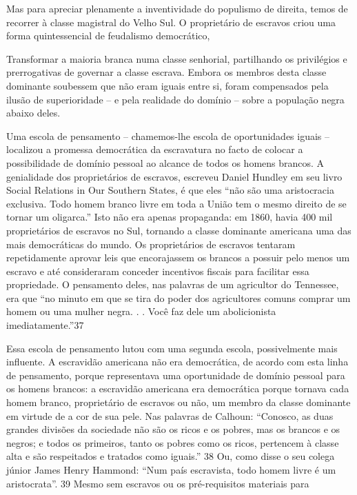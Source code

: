  \par 
Mas para apreciar plenamente a inventividade do populismo de direita, temos de recorrer à classe magistral do Velho Sul. O proprietário de escravos criou uma forma quintessencial de feudalismo democrático,
 \par 
Transformar a maioria branca numa classe senhorial, partilhando os privilégios e prerrogativas de governar a classe escrava. Embora os membros desta classe dominante soubessem que não eram iguais entre si, foram compensados ​​pela ilusão de superioridade – e pela realidade do domínio – sobre a população negra abaixo deles.
 \par 
Uma escola de pensamento – chamemos-lhe escola de oportunidades iguais – localizou a promessa democrática da escravatura no facto de colocar a possibilidade de domínio pessoal ao alcance de todos os homens brancos. A genialidade dos proprietários de escravos, escreveu Daniel Hundley em seu livro Social Relations in Our Southern States, é que eles “não são uma aristocracia exclusiva. Todo homem branco livre em toda a União tem o mesmo direito de se tornar um oligarca.” Isto não era apenas propaganda: em 1860, havia {\color{blue}400} mil proprietários de escravos no Sul, tornando a classe dominante americana uma das mais democráticas do mundo. Os proprietários de escravos tentaram repetidamente aprovar leis que encorajassem os brancos a possuir pelo menos um escravo e até consideraram conceder incentivos fiscais para facilitar essa propriedade. O pensamento deles, nas palavras de um agricultor do Tennessee, era que “no minuto em que se tira do poder dos agricultores comuns comprar um homem ou uma mulher negra. . . Você faz dele um abolicionista imediatamente.”{\color{blue}37}
 \par 
Essa escola de pensamento lutou com uma segunda escola, possivelmente mais influente. A escravidão americana não era democrática, de acordo com esta linha de pensamento, porque representava uma oportunidade de domínio pessoal para os homens brancos: a escravidão americana era democrática porque tornava cada homem branco, proprietário de escravos ou não, um membro da classe dominante em virtude de a cor de sua pele. Nas palavras de Calhoun: “Conosco, as duas grandes divisões da sociedade não são os ricos e os pobres, mas os brancos e os negros; e todos os primeiros, tanto os pobres como os ricos, pertencem à classe alta e são respeitados e tratados como iguais.” {\color{blue}38} Ou, como disse o seu colega júnior James Henry Hammond: “Num país escravista, todo homem livre é um aristocrata”. {\color{blue}39} Mesmo sem escravos ou os pré-requisitos materiais para
